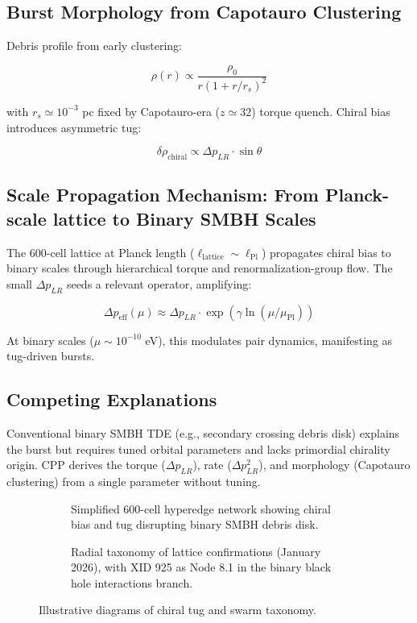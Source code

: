 \documentclass[11pt]{article}
\begin{document}
\subsection{Burst Morphology from Capotauro Clustering}
Debris profile from early clustering:

\[
\rho(r) \propto \frac{\rho_0}{r (1 + r/r_s)^2}
\]

with $r_s \simeq 10^{-3}$ pc fixed by Capotauro-era ($z \simeq 32$) torque quench. Chiral bias introduces asymmetric tug:

\[
\delta \rho_{\text{chiral}} \propto \Delta p_{LR} \cdot \sin\theta
\]

\subsection{Scale Propagation Mechanism: From Planck-scale lattice to Binary SMBH Scales}
The 600-cell lattice at Planck length ($\ell_{\text{lattice}} \sim \ell_{\text{Pl}}$) propagates chiral bias to binary scales through hierarchical torque and renormalization-group flow. The small $\Delta p_{LR}$ seeds a relevant operator, amplifying:

\[
\Delta p_{\text{eff}}(\mu) \approx \Delta p_{LR} \cdot \exp(\gamma \ln(\mu / \mu_{\text{Pl}}))
\]

At binary scales ($\mu \sim 10^{-10}$ eV), this modulates pair dynamics, manifesting as tug-driven bursts.

\subsection{Competing Explanations}
Conventional binary SMBH TDE (e.g., secondary crossing debris disk) explains the burst but requires tuned orbital parameters and lacks primordial chirality origin. CPP derives the torque ($\Delta p_{LR}$), rate ($\Delta p_{LR}^2$), and morphology (Capotauro clustering) from a single parameter without tuning.

\begin{figure}[htbp]
\centering
\begin{subfigure}{0.45\textwidth}
\centering
\caption{Simplified 600-cell hyperedge network showing chiral bias and tug disrupting binary SMBH debris disk.}
\label{fig:chiral-tug}
\end{subfigure}
\hfill
\begin{subfigure}{0.45\textwidth}
\centering
\caption{Radial taxonomy of lattice confirmations (January 2026), with XID 925 as Node 8.1 in the binary black hole interactions branch.}
\label{fig:taxonomy}
\end{subfigure}
\caption{Illustrative diagrams of chiral tug and swarm taxonomy.}
\end{figure}
\end{document}
